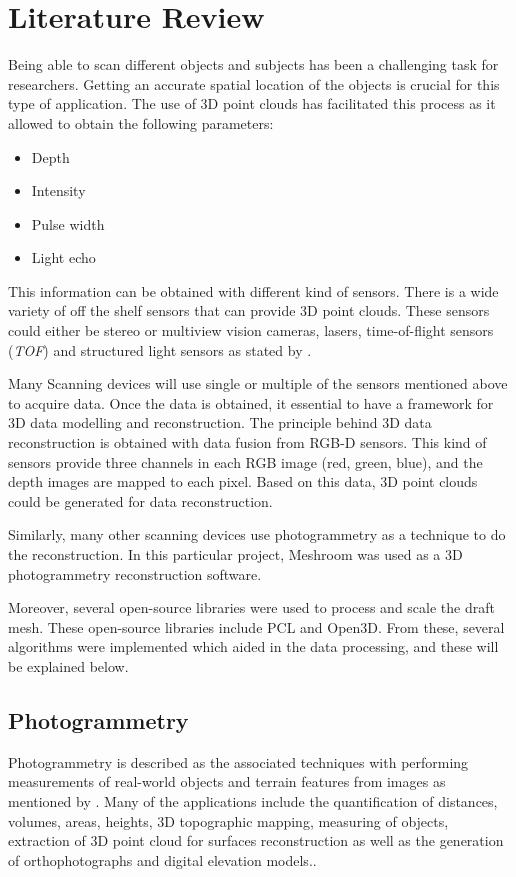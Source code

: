 \documentclass[12pt]{report}
\begin{document}
\chapter{Literature Review}
Being able to scan different objects and subjects has been a challenging task for researchers. Getting an accurate spatial location of the objects is crucial for this type of application.
The use of 3D point clouds has facilitated this process as it allowed to obtain the following parameters:
\begin{itemize}[]
  \itemsep0em 
  \item Depth
  \item Intensity
  \item Pulse width
  \item Light echo
\end{itemize}
This information can be obtained with different kind of sensors. There is a wide variety of off the shelf sensors that can provide 3D point clouds. 
These sensors could either be stereo or multiview vision cameras, lasers, time-of-flight sensors (\textit{TOF}) and structured light sensors as stated by .

Many Scanning devices will use single or multiple of the sensors mentioned above to acquire data. Once the data is obtained, it essential to have a framework for 3D data modelling and reconstruction.
The principle behind 3D data reconstruction is obtained with data fusion from RGB-D sensors. This kind of sensors provide three channels in each RGB image (red, green, blue), and the depth images are mapped to each pixel. Based on this data, 3D point clouds could be generated for data reconstruction.

Similarly, many other scanning devices use photogrammetry as a technique to do the reconstruction. In this particular project, Meshroom was used as a 3D photogrammetry reconstruction software.

Moreover, several open-source libraries were used to process and scale the draft mesh. These open-source libraries include PCL and Open3D. From these, several algorithms were implemented which aided in the data processing, and these will be explained below. 
\enlargethispage{\baselineskip}



\section{Photogrammetry}
Photogrammetry is described as the associated techniques with performing measurements of real-world objects and terrain features from images as mentioned by .
Many of the applications include the quantification of distances, volumes, areas, heights, 3D topographic mapping, measuring of objects, extraction of 3D point cloud for surfaces reconstruction as well as the generation of orthophotographs and digital elevation models..
\end{document}
